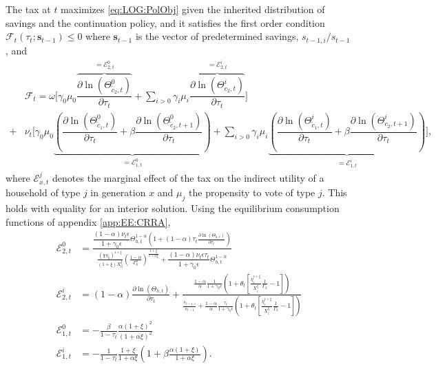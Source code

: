 The tax at $t$ maximizes \eqref{eq:LOG:PolObj} given the inherited distribution of savings and the continuation policy, and it satisfies the first order condition $\mathcal{F}_t(\tau_t; \bm{s}_{t-1}) \leq 0$ where $\bm{s}_{t-1}$ is the vector of predetermined savings, $s_{t-1,i}/s_{t-1}$, and  
\begin{align*}
    &\mathcal{F}_t = \omega\Bigg[\gamma_0\mu_0 \overbrace{\dfrac{\partial \ln\left(\Theta_{\tilde{c}_2,t}^0\right)}{\partial \tau_t}}^{=\mathcal{E}_{2,t}^0}+\sum_{i>0}\gamma_i\mu_i \overbrace{\dfrac{\partial \ln\left(\Theta_{c_2,t}^i\right)}{\partial \tau_t}}^{= \mathcal{E}_{2,t}^i}\Bigg]
    \\+&\nu_t\Bigg[ \gamma_0\mu_0 \underbrace{\left(\dfrac{\partial \ln\left(\Theta_{\tilde{c}_1,t}^0\right)}{\partial \tau_t}+\beta\dfrac{\partial \ln\left(\Theta_{\tilde{c}_2,t+1}^0\right)}{\partial \tau_t}\right)}_{= \mathcal{E}_{1,t}^0}
    +\sum_{i>0}\gamma_i\mu_i \underbrace{\left(\dfrac{\partial \ln\left(\Theta_{\tilde{c}_1,t}^i\right)}{\partial \tau_t}+\beta\dfrac{\partial \ln\left(\Theta_{c_2,t+1}^i\right)}{\partial \tau_t}\right)}_{= \mathcal{E}_{1,t}^i}\Bigg],
\end{align*}
where $\mathcal{E}_{x,t}^j$ denotes the marginal effect of the tax on the indirect utility of a household of type $j$ in generation $x$ and $\mu_j$ the propensity to vote of type $j$. This holds with equality for an interior solution. Using the equilibrium consumption functions of appendix \ref{app:EE:CRRA},
\begin{align}
    \mathcal{E}_{2,t}^0 & = \frac{\dfrac{(1-\alpha)\nu_t\epsilon}{1+\gamma_0\epsilon} \Theta_{h,t}^{1-\alpha}\left(1+(1-\alpha)\tau_t\frac{\partial \ln\left(\Theta_{h,t}\right)}{\partial\tau_t}\right)}{\frac{\left(\chi\eta_{0}\right)^{1+\xi}}{(1+\xi)X_{0}^{\xi}}\left(\frac{1-\alpha}{\Gamma_{h}^{\alpha}}\right)^{\frac{1+\xi}{1+\alpha\xi}}+\dfrac{(1-\alpha)\nu_t\epsilon\tau_t}{1+\gamma_0\epsilon} \Theta_{h,t}^{1-\alpha}} \label{eq:LOG:E20}\\
    \mathcal{E}_{2,t}^i&= (1-\alpha)\frac{\partial \ln\left(\Theta_{h,t}\right)}{\partial \tau_t}+\frac{\frac{1-\alpha}{\alpha}\frac{1}{1+\gamma_0\epsilon}\left(1+\theta_t\left[\frac{\eta_{i}^{1+\xi}}{X_{i}^{\xi}}\frac{1}{\Gamma_{h}}-1\right]\right)}{\frac{s_{t-1,i}}{s_{t-1}}+\frac{1-\alpha}{\alpha}\frac{\tau_t}{1+\gamma_0\epsilon}\left(1+\theta_t\left[\frac{\eta_{i}^{1+\xi}}{X_{i}^{\xi}}\frac{1}{\Gamma_{h}}-1\right]\right)} \label{eq:LOG:E2i}\\
    \mathcal{E}_{1,t}^0 &= -\frac{\beta}{1-\tau_t}\frac{\alpha(1+\xi)^2}{(1+\alpha\xi)^2} \label{eq:LOG:E10}\\
    \mathcal{E}_{1,t}^i &= -\frac{1}{1-\tau_t}\frac{1+\xi}{1+\alpha\xi}\left(1+\beta\frac{\alpha(1+\xi)}{1+\alpha\xi}\right). \label{eq:LOG:E1i}
 \end{align}

